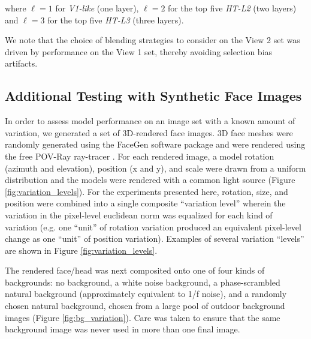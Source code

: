 where $\ell=1$ for
\emph{V1-like} (one layer), $\ell=2$ for the top five \emph{HT-L2} (two layers)
and $\ell=3$ for the top five \emph{HT-L3} (three layers).

We note that the choice of blending strategies to consider on the View 2 set was 
driven by performance on the View 1 set, thereby avoiding selection bias artifacts.

\subsection{Additional Testing with Synthetic Face Images}

In order to assess model performance on an image set with a known amount of variation, 
we generated a set of 3D-rendered face images.  3D face meshes were randomly generated
using the FaceGen \cite{facegen} software package and were rendered using
the free POV-Ray ray-tracer \cite{povray}.  For each rendered image, a model rotation 
(azimuth and elevation), position (x and y), and scale were drawn from a uniform 
distribution and the models were rendered with a common light source (Figure \ref{fig:variation_levels}).  
For the experiments presented here, rotation, size, and position were combined into
a single composite ``variation level'' wherein the variation in the pixel-level euclidean norm
was equalized for each kind of variation (e.g. one ``unit'' of rotation variation produced an
equivalent pixel-level change as one ``unit'' of position variation).  Examples of several
variation ``levels'' are shown in Figure \ref{fig:variation_levels}.

The rendered face/head was next composited onto one of four kinds of backgrounds: no
background, a white noise background, a phase-scrambled natural background 
(approximately equivalent to 1/f noise), and a randomly chosen natural background, chosen from
a large pool of outdoor background images (Figure \ref{fig:bg_variation}).  Care was taken 
to ensure that the same background image was never used in more than one final image.

